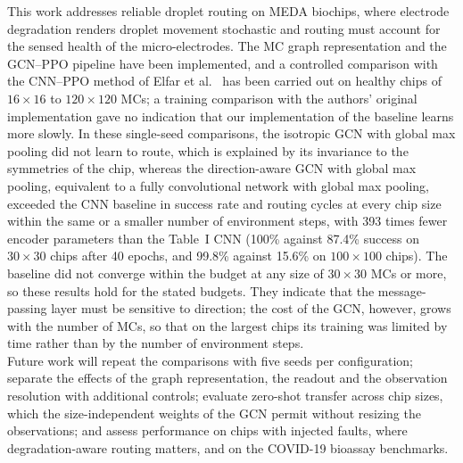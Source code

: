 \documentclass[11pt,a4paper]{article}
\begin{document}
This work addresses reliable droplet routing on MEDA biochips, where
electrode degradation renders droplet movement stochastic and routing must
account for the sensed health of the micro-electrodes. The MC graph
representation and the GCN--PPO pipeline have been implemented, and a
controlled comparison with the CNN--PPO method of Elfar et al.\
\cite{elfar2023} has been carried out on healthy chips of $16\times16$ to
$120\times120$ MCs; a training comparison with the authors' original
implementation gave no indication that our implementation of the baseline
learns more slowly. In these single-seed comparisons, the isotropic GCN with
global max pooling did not learn to route, which is explained by its invariance
to the symmetries of the chip, whereas the direction-aware GCN with global max
pooling, equivalent to a fully convolutional network with global max pooling,
exceeded the CNN baseline in success rate and routing cycles at every chip
size within the same or a smaller number of environment steps, with 393 times
fewer encoder parameters than the Table~I CNN (100\% against 87.4\% success on $30\times30$ chips after
40 epochs, and 99.8\% against 15.6\% on $100\times100$ chips). The baseline did
not converge within the budget at any size of $30\times30$ MCs or more, so
these results hold for the stated budgets. They indicate that the
message-passing layer must be sensitive to direction; the cost of the GCN,
however, grows with the number of MCs, so that on the largest chips its
training was limited by time rather than by the number of environment steps.\\
Future work will repeat the comparisons with five seeds per configuration;
separate the effects of the graph representation, the readout and the
observation resolution with additional controls; evaluate zero-shot transfer
across chip sizes, which the size-independent weights of the GCN permit
without resizing the observations; and assess performance on chips with
injected faults, where degradation-aware routing matters, and on the COVID-19
bioassay benchmarks.
\end{document}
